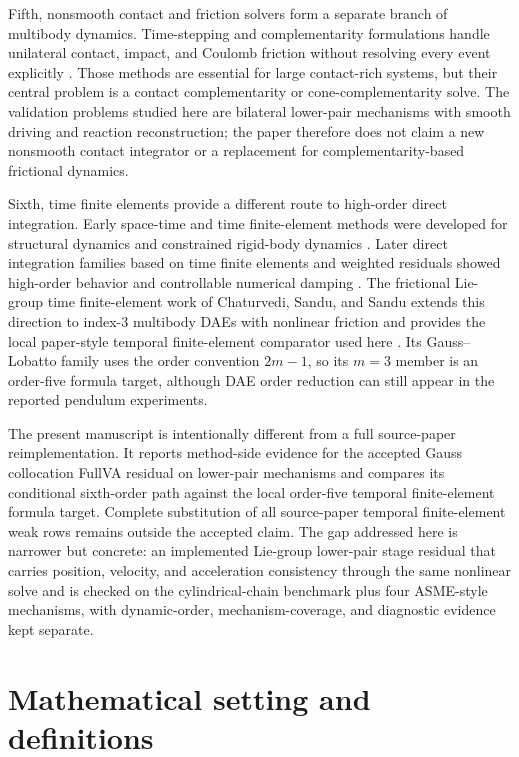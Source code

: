 \documentclass[preprint,12pt]{elsarticle}
\begin{document}
Fifth, nonsmooth contact and friction solvers form a separate branch of
multibody dynamics. Time-stepping and complementarity formulations handle
unilateral contact, impact, and Coulomb friction without resolving every
event explicitly
\cite{stewart1996implicit,anitescu1997formulating,tasora2011matrixfree}.
Those methods are essential for large contact-rich systems, but their central
problem is a contact complementarity or cone-complementarity solve. The
validation problems studied here are bilateral lower-pair mechanisms with smooth
driving and reaction reconstruction; the paper therefore does not claim a
new nonsmooth contact integrator or a replacement for complementarity-based
frictional dynamics.

Sixth, time finite elements provide a different route to high-order direct
integration. Early space-time and time finite-element methods were developed
for structural dynamics and constrained rigid-body dynamics
\cite{borri1988rigid,hughes1988spacetime,hulbert1992time}. Later direct
integration families based on time finite elements and weighted residuals
showed high-order behavior and controllable numerical damping
\cite{kim2017higher,jog2016robust,bauchau2024time}. The frictional
Lie-group time finite-element work of Chaturvedi, Sandu, and Sandu extends
this direction to index-3 multibody DAEs with nonlinear friction and provides
the local paper-style temporal finite-element comparator used here
\cite{chaturvedi2026tfe}. Its Gauss--Lobatto family uses the order convention
$2m-1$, so its $m=3$ member is an order-five formula target, although DAE
order reduction can still appear in the reported pendulum experiments.

The present manuscript is intentionally different from a full source-paper
reimplementation. It reports method-side evidence for the accepted Gauss
collocation FullVA residual on lower-pair mechanisms and compares its
conditional sixth-order path against the local order-five temporal
finite-element formula target. Complete
substitution of all source-paper temporal finite-element weak rows remains
outside the accepted claim. The gap addressed here is narrower but concrete:
an implemented Lie-group lower-pair stage residual that carries position,
velocity, and acceleration consistency through the same nonlinear solve and is
checked on the cylindrical-chain benchmark plus four ASME-style mechanisms,
with dynamic-order, mechanism-coverage, and diagnostic evidence kept separate.

\section{Mathematical setting and definitions}
\end{document}
